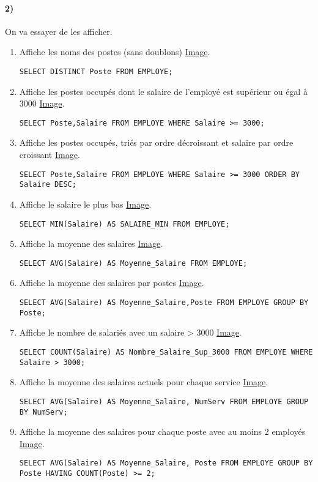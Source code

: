 \documentclass{report}
\begin{document}
\paragraph{2)}On va essayer de les afficher.
\begin{enumerate}
	\item Affiche les noms des postes (sans doublons) \href{run:./Images/TP4/tp4_9.png}{Image}.
	\begin{lstlisting}
SELECT DISTINCT Poste FROM EMPLOYE;
	\end{lstlisting} 
	\item Affiche les postes occupés dont le salaire de l'employé est supérieur ou égal à 3000 \href{run:./Images/TP4/tp4_10.png}{Image}.
	\begin{lstlisting}
SELECT Poste,Salaire FROM EMPLOYE WHERE Salaire >= 3000;
	\end{lstlisting}
	\item Affiche les postes occupés, triés par ordre décroissant et salaire par ordre croissant \href{run:./Images/TP4/tp4_11.png}{Image}.
	\begin{lstlisting}
SELECT Poste,Salaire FROM EMPLOYE WHERE Salaire >= 3000 ORDER BY Salaire DESC;
	\end{lstlisting}
	\item Affiche le salaire le plus bas \href{run:./Images/TP4/tp4_12.png}{Image}.
	\begin{lstlisting}
SELECT MIN(Salaire) AS SALAIRE_MIN FROM EMPLOYE;
	\end{lstlisting}
	\item Affiche la moyenne des salaires \href{run:./Images/TP4/tp4_13.png}{Image}.
	\begin{lstlisting}
SELECT AVG(Salaire) AS Moyenne_Salaire FROM EMPLOYE;
	\end{lstlisting}
	\item Affiche la moyenne des salaires par postes \href{run:./Images/TP4/tp4_14.png}{Image}.
	\begin{lstlisting}
SELECT AVG(Salaire) AS Moyenne_Salaire,Poste FROM EMPLOYE GROUP BY Poste;
	\end{lstlisting}
	\item Affiche le nombre de salariés avec un salaire > 3000 \href{run:./Images/TP4/tp4_15.png}{Image}.
	\begin{lstlisting}
SELECT COUNT(Salaire) AS Nombre_Salaire_Sup_3000 FROM EMPLOYE WHERE Salaire > 3000;
	\end{lstlisting}
	\item Affiche la moyenne des salaires actuels pour chaque service \href{run:./Images/TP4/tp4_16.png}{Image}.
	\begin{lstlisting}
SELECT AVG(Salaire) AS Moyenne_Salaire, NumServ FROM EMPLOYE GROUP BY NumServ;
	\end{lstlisting}
	\item Affiche la moyenne des salaires pour chaque poste avec au moins 2 employés \href{run:./Images/TP4/tp4_17.png}{Image}.
	\begin{lstlisting}
SELECT AVG(Salaire) AS Moyenne_Salaire, Poste FROM EMPLOYE GROUP BY Poste HAVING COUNT(Poste) >= 2;
	\end{lstlisting}
\end{enumerate}
\end{document}
